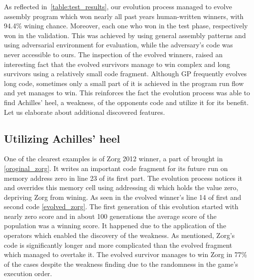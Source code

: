 \documentclass[dvipsnames,format=sigconf,anonymous=true,review=true]{acmart}
\begin{document}
As reflected in~\autoref{table:test_results}, our evolution process managed to evolve assembly program which won nearly all past years human-written winners, with 94.4\% wining chance. Moreover, each one who won in the test phase, respectively won in the validation. This was achieved by using general assembly patterns and using adversarial environment for evaluation, while the adversary's code was never accessible to ours.
The inspection of the evolved winners, raised an interesting fact that the evolved survivors manage to win complex and long survivors using a relatively small code fragment. Although GP frequently evolves long code, sometimes only a small part of it is achieved in the program run flow and yet manages to win. This reinforces the fact the evolution process was able to find Achilles' heel, a weakness, of the opponents code and utilize it for its benefit. Let us elaborate about additional discovered features.

\subsection{Utilizing Achilles' heel}
One of the clearest examples is of Zorg 2012 winner, a part of brought in \autoref{oroginal_zorg}. It writes an important code fragment for its future run on memory address zero in line 23 of its first part. The evolution process notices it and overrides this memory cell using addressing di which holds the value zero, depriving Zorg from wining. As seen in the evolved winner's line 14 of first and second code \autoref{evolved_zorg}. The first generation of this evolution started with nearly zero score and in about 100 generations the average score of the population was a winning score. It happened due to the application of the operators which enabled the discovery of the weakness. As mentioned, Zorg's code is significantly longer and more complicated than the evolved fragment which managed to overtake it. The evolved survivor manages to win Zorg in 77\% of the cases despite the weakness finding due to the randomness in the game's execution order.

\end{document}
